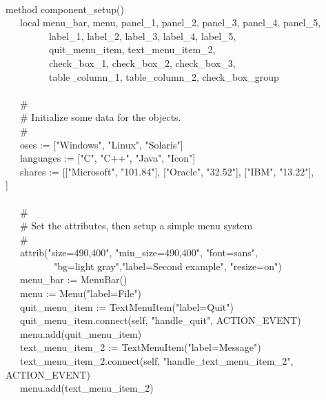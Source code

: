 {\ \\
\>   method component\_setup() \\
\>   \ \ \ local menu\_bar, menu, panel\_1, panel\_2, panel\_3, panel\_4, panel\_5, \\
\>   \ \ \ \ \ \ \ \ \ label\_1, label\_2, label\_3, label\_4, label\_5, \\
\>   \ \ \ \ \ \ \ \ \ quit\_menu\_item, text\_menu\_item\_2, \\
\>   \ \ \ \ \ \ \ \ \ check\_box\_1, check\_box\_2, check\_box\_3, \\
\>   \ \ \ \ \ \ \ \ \ table\_column\_1, table\_column\_2, check\_box\_group \\
\ \\
\>   \ \ \ \# \\
\>   \ \ \ \# Initialize some data for the objects. \\
\>   \ \ \ \# \\
\>   \ \ \ oses := ["Windows",
"Linux",
"Solaris"] \\
\>   \ \ \ languages := ["C",
"C++", "Java",
"Icon"] \\
\>   \ \ \ shares := [["Microsoft",
"101.84"],
["Oracle",
"32.52"],
["IBM",
"13.22"], \\
\>\>\>
["Intel",
"142.00"]] \\
\ \\
\>   \ \ \ \# \\
\>   \ \ \ \# Set the attributes, then setup a simple menu system \\
\>   \ \ \ \# \\
\>   \ \ \ attrib("size=490,400",
"min\_size=490,400",
"font=sans", \\
\>   \ \ \ \ \ \ \ \ \ \ "bg=light
gray","label=Second example",
"resize=on") \\
\>   \ \ \ menu\_bar := MenuBar() \\
\>   \ \ \ menu := Menu("label=File") \\
\>   \ \ \ quit\_menu\_item := TextMenuItem("label=Quit") \\
\>   \ \ \ quit\_menu\_item.connect(self, "handle\_quit", ACTION\_EVENT) \\
\>   \ \ \ menu.add(quit\_menu\_item) \\
\>   \ \ \ text\_menu\_item\_2 :=
TextMenuItem("label=Message") \\
\>   \ \ \ text\_menu\_item\_2.connect(self,
"handle\_text\_menu\_item\_2",\\
\>\>\>\>\>ACTION\_EVENT) \\
\>   \ \ \ menu.add(text\_menu\_item\_2) \\
}
